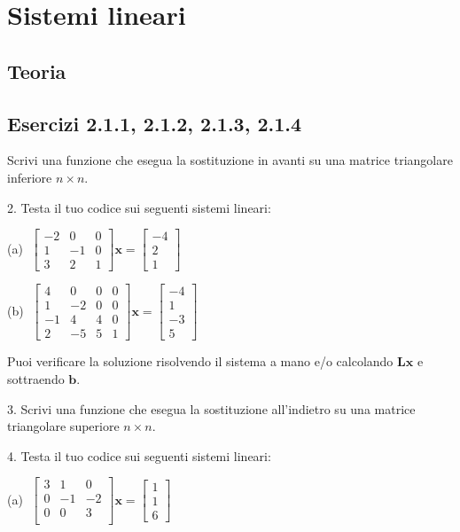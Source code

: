 \documentclass[letterpaper, 12pt]{article}
\begin{document}
\section{Sistemi lineari}
\label{sistemi_lineari}
\subsection{Teoria}

\subsection{Esercizi 2.1.1, 2.1.2, 2.1.3, 2.1.4}
Scrivi una funzione che esegua la sostituzione in avanti su una matrice triangolare inferiore $n\times n$.

2. Testa il tuo codice sui seguenti sistemi lineari:
     
    (a) $\; \begin{bmatrix}
        -2 & 0 & 0 \\
        1 & -1 & 0 \\
        3 & 2 & 1 
      \end{bmatrix} 
      \mathbf{x} = \begin{bmatrix}
        -4 \\ 2 \\ 1
      \end{bmatrix}\qquad$

    (b) $\;\begin{bmatrix}
        4 & 0 & 0 & 0 \\
        1 & -2 & 0 & 0 \\
        -1 & 4 & 4 & 0 \\
        2 & -5 & 5 & 1
      \end{bmatrix} 
      \mathbf{x} = \begin{bmatrix}
        -4 \\ 1 \\ -3 \\ 5
      \end{bmatrix}$

Puoi verificare la soluzione risolvendo il sistema a mano e/o calcolando $\mathbf{L}\mathbf{x}$ e sottraendo $\mathbf{b}$.

3. Scrivi una funzione che esegua la sostituzione all'indietro su una matrice triangolare superiore $n\times n$.

4. Testa il tuo codice sui seguenti sistemi lineari:

    (a) $\;\begin{bmatrix}
      3 & 1 & 0  \\
      0 & -1 & -2  \\
      0 & 0 & 3  \\
    \end{bmatrix} \mathbf{x} = \begin{bmatrix}
      1 \\ 1 \\ 6
    \end{bmatrix}\qquad$
\end{document}
